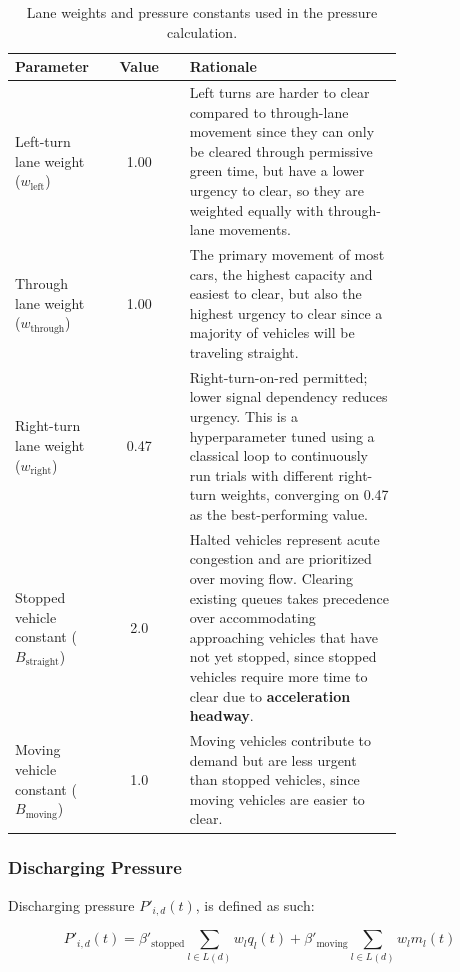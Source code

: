 \documentclass[12pt]{article}
\begin{document}
\begin{table}[H]
\centering
\begin{tabular}{@{} p{0.22\linewidth} c p{0.55\linewidth} @{}}
\toprule
\textbf{Parameter} & \textbf{Value} & \textbf{Rationale} \\
\midrule
Left-turn lane weight ($w_{\text{left}}$) & 1.00 &
Left turns are harder to clear compared to through-lane movement since they can only be cleared through permissive green time, but have a lower urgency to clear, so they are weighted equally with through-lane movements. \\
Through lane weight ($w_{\text{through}}$) & 1.00 &
The primary movement of most cars, the highest capacity and easiest to clear, but also the highest urgency to clear since a majority of vehicles will be traveling straight. \\
Right-turn lane weight ($w_{\text{right}}$) & 0.47 &
Right-turn-on-red permitted; lower signal dependency reduces urgency. This is a hyperparameter tuned using a classical loop to continuously run trials with different right-turn weights, converging on 0.47 as the best-performing value. \\
Stopped vehicle constant ($B_{\text{straight}}$) & 2.0 &
Halted vehicles represent acute congestion and are prioritized over moving flow. Clearing existing queues takes precedence over accommodating approaching vehicles that have not yet stopped, since stopped vehicles require more time to clear due to \textbf{acceleration headway}. \\
Moving vehicle constant ($B_{\text{moving}}$) & 1.0 &
Moving vehicles contribute to demand but are less urgent than stopped vehicles, since moving vehicles are easier to clear. \\
\bottomrule
\end{tabular}
\caption{Lane weights and pressure constants used in the pressure calculation.}
\label{tab:pressure-constants}
\end{table}
\subsubsection{Discharging Pressure}

Discharging pressure \(P'_{i,d}(t)\), is defined as such:

\begin{equation}
\label{eq:discharge_pressure}
P'_{i,d}(t) = \beta'_{\text{stopped}} \sum_{l\in L(d)} w_l q_l(t) + \beta'_{\text{moving}} \sum_{l\in L(d)} w_l m_l(t)
\end{equation}
\end{document}
